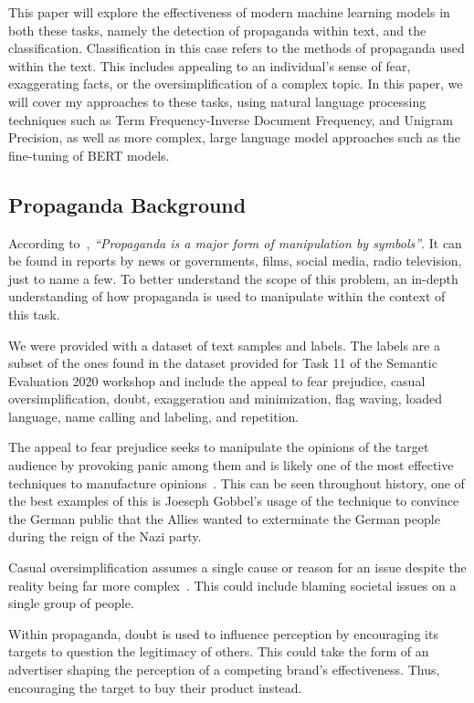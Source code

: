 \documentclass[twocolumn]{article}
\begin{document}
This paper will explore the effectiveness of modern machine learning models in both these tasks, namely the detection of propaganda within text, and the classification. Classification in this case refers to the methods of propaganda used within the text. This includes appealing to an individual's sense of fear, exaggerating facts, or the oversimplification of a complex topic. In this paper, we will cover my approaches to these tasks, using natural language processing techniques such as Term Frequency-Inverse Document Frequency, and Unigram Precision, as well as more complex, large language model approaches such as the fine-tuning of BERT models. 

\subsection{Propaganda Background}

According to~\textcite{scott1994power}, \emph{``Propaganda is a major form of manipulation by symbols''}. It can be found in reports by news or governments, films, social media, radio television, just to name a few. To better understand the scope of this problem, an in-depth understanding of how propaganda is used to manipulate within the context of this task. 

We were provided with a dataset of text samples and labels. The labels are a subset of the ones found in the dataset provided for Task 11 of the Semantic Evaluation 2020 workshop and include the appeal to fear prejudice, casual oversimplification, doubt, exaggeration and minimization, flag waving, loaded language, name calling and labeling, and repetition. 

The appeal to fear prejudice seeks to manipulate the opinions of the target audience by provoking panic among them and is likely one of the most effective techniques to manufacture opinions~\cite{tannenbaum2015appeal}. This can be seen throughout history, one of the best examples of this is Joeseph Gobbel's usage of the technique to convince the German public that the Allies wanted to exterminate the German people during the reign of the Nazi party. 

Casual oversimplification assumes a single cause or reason for an issue despite the reality being far more complex~\cite{da-san-martino-etal-2020-semeval}. This could include blaming societal issues on a single group of people.  

Within propaganda, doubt is used to influence perception by encouraging its targets to question the legitimacy of others. This could take the form of an advertiser shaping the perception of a competing brand's effectiveness. Thus, encouraging the target to buy their product instead. 
\end{document}
